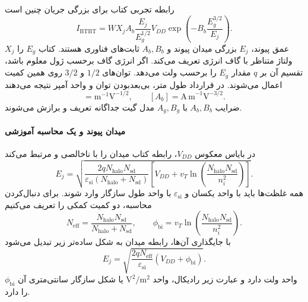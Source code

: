 رابطه تجربی  کتاب برای بزرگی جریان چنین است
\begin{equation}
 I_{\mathrm{BTBT}}=WX_j A_b\frac{E_j}{E_g^{1/2}}V_{DD}
 \exp\!\left(-B_b\frac{E_g^{3/2}}{E_j}\right).
 \label{eq:junction-btbt-model}
\end{equation}
\(X_j\) عمق پیوند، \(E_j\) بزرگی میدان پیوند و \(A_b,B_b\)
ثابت‌های فناوری هستند. کتاب \(E_g\) را ولتاژ متناظر با گاف انرژی
تعریف می‌کند. اگر انرژی گاف برحسب ژول معلوم باشد، تقسیم آن بر
\(q\) مقدار \(E_g\) را برحسب ولت می‌دهد.
توان‌های \(1/2\) و \(3/2\) روی همین کمیت اعمال می‌شوند.
در قرارداد طول متر، بی‌بعدبودن توان و واحد آمپر نتیجه می‌دهند
\begin{equation}
 [B_b]=\mathrm{m}^{-1}\mathrm{V}^{-1/2},\qquad
 [A_b]=\mathrm{A\,m}^{-1}\mathrm{V}^{-3/2}.
 \label{eq:junction-btbt-units}
\end{equation}
ضرایب \(A_b,B_b\) با \(A_g,B_g\) مدل گیت جداگانه تعریف و برازش
می‌شوند.

\paragraph*{میدان پیوند و یک محاسبه آموزشی}
در بایاس معکوس \(V_{DD}\)، رابطه  کتاب میدان را با
ناخالصی  و  مرتبط می‌کند
\begin{equation}
 E_j=\sqrt{\frac{2qN_{\mathrm{halo}}N_{\mathrm{sd}}}
 {\varepsilon_{\mathrm{si}}(N_{\mathrm{halo}}+N_{\mathrm{sd}})}
 \left[V_{DD}+v_T\ln\!\left(
 \frac{N_{\mathrm{halo}}N_{\mathrm{sd}}}{n_i^2}\right)\right]}.
 \label{eq:junction-field-model}
\end{equation}
همه غلظت‌ها باید با واحد یکسان و \(\varepsilon_{\mathrm{si}}\) با
واحد طول سازگار وارد شوند. برای دنبال‌کردن محاسبه،
دو کمیت کمکی را تعریف می‌کنیم
\begin{equation}
 N_{\mathrm{eff}}=\frac{N_{\mathrm{halo}}N_{\mathrm{sd}}}
 {N_{\mathrm{halo}}+N_{\mathrm{sd}}},\qquad
 \phi_{\mathrm{bi}}=v_T\ln\!\left(
 \frac{N_{\mathrm{halo}}N_{\mathrm{sd}}}{n_i^2}\right).
 \label{eq:junction-field-parameters}
\end{equation}
با جایگذاری آن‌ها، رابطه میدان به شکل ساده‌تر زیر تبدیل می‌شود
\[
 E_j=\sqrt{\frac{2qN_{\mathrm{eff}}}{\varepsilon_{\mathrm{si}}}
 (V_{DD}+\phi_{\mathrm{bi}})}.
\]
\(\phi_{\mathrm{bi}}\) واحد ولت دارد و عبارت زیر رادیکال، واحد
\(\mathrm{V}^2/\mathrm{m}^2\) یا شکل سازگار سانتی‌متری آن را دارد.

